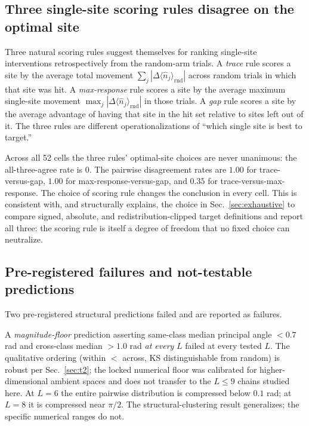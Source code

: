 \documentclass[aps,prresearch,reprint,amsmath,amssymb,longbibliography,floatfix]{revtex4-2}
\newcommand{\nop}{\hat{n}}
\begin{document}
\subsection{Three single-site scoring rules disagree on the optimal site}
\label{sec:t5}

Three natural scoring rules suggest themselves for ranking single-site
interventions retrospectively from the random-arm trials.
A \emph{trace} rule scores a site by the average total movement
$\sum_j |\Delta\langle\nop_j\rangle_{\mathrm{rnd}}|$ across random
trials in which that site was hit.
A \emph{max-response} rule scores a site by the average maximum
single-site movement $\max_j |\Delta\langle\nop_j\rangle_{\mathrm{rnd}}|$
in those trials.
A \emph{gap} rule scores a site by the average advantage of having that
site in the hit set relative to sites left out of it.
The three rules are different operationalizations of ``which single
site is best to target.''

Across all 52 cells the three rules' optimal-site choices are never
unanimous: the all-three-agree rate is $0$.
The pairwise disagreement rates are $1.00$ for trace-versus-gap,
$1.00$ for max-response-versus-gap, and $0.35$ for
trace-versus-max-response.
The choice of scoring rule changes the conclusion in every cell.
This is consistent with, and structurally explains, the choice in
Sec.~\ref{sec:exhaustive} to compare signed, absolute, and
redistribution-clipped target definitions and report all three:
the scoring rule is itself a degree of freedom that no fixed choice can
neutralize.

\subsection{Pre-registered failures and not-testable predictions}
\label{sec:scope_t}

Two pre-registered structural predictions failed and are reported as
failures.

A \emph{magnitude-floor} prediction asserting same-class median
principal angle $< 0.7$ rad and cross-class median $> 1.0$ rad
\emph{at every} $L$ failed at every tested $L$.
The qualitative ordering (within $<$ across, KS distinguishable from
random) is robust per Sec.~\ref{sec:t2}; the locked numerical floor was
calibrated for higher-dimensional ambient spaces and does not transfer
to the $L\leq 9$ chains studied here.
At $L=6$ the entire pairwise distribution is compressed below $0.1$
rad; at $L=8$ it is compressed near $\pi/2$.
The structural-clustering result generalizes; the specific numerical
ranges do not.
\end{document}

